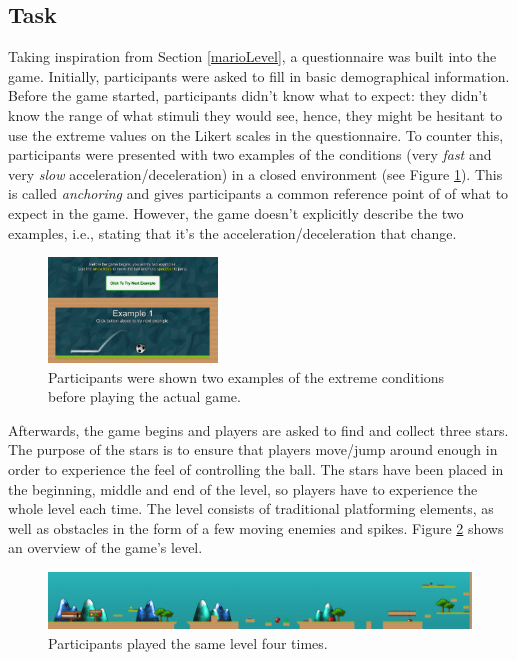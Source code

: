 \subsection{Task} \label{task}
Taking inspiration from Section \ref{marioLevel}, a questionnaire was built into the game. Initially, participants were asked to fill in basic demographical information. Before the game started, participants didn't know what to expect: they didn't know the range of what stimuli they would see, hence, they might be hesitant to use the extreme values on the Likert scales in the questionnaire. To counter this, participants were presented with two examples of the conditions (very \textit{fast} and very \textit{slow} acceleration/deceleration) in a closed environment (see Figure \ref{fig:example}). This is called \textit{anchoring} \cite{cunningham} and gives participants a common reference point of of what to expect in the game. However, the game doesn't explicitly describe the two examples, i.e., stating that it's the acceleration/deceleration that change.

\begin{figure}[htbp]
\centering
\includegraphics[width=0.4\textwidth]{Pics/example}
\caption{Participants were shown two examples of the extreme conditions before playing the actual game.}
\label{fig:example}
\end{figure}

Afterwards, the game begins and players are asked to find and collect three stars. The purpose of the stars is to ensure that players move/jump around enough in order to experience the feel of controlling the ball. The stars have been placed in the beginning, middle and end of the level, so players have to experience the whole level each time. The level consists of traditional platforming elements, as well as obstacles in the form of a few moving enemies and spikes. Figure \ref{fig:level} shows an overview of the game's level.

\begin{figure}[htbp]
\centering
\includegraphics[width=1\textwidth]{Pics/levelStructure}
\caption{Participants played the same level four times.}
\label{fig:level}
\end{figure}

